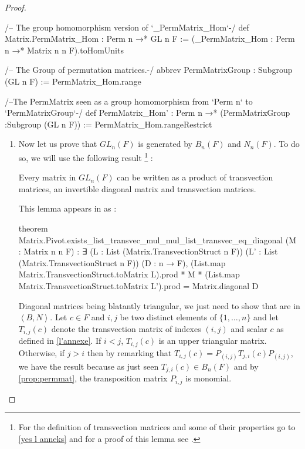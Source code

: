 \begin{proof}
\begin{leancode}
/-- The group homomorphism version of `_PermMatrix_Hom`-/
def Matrix.PermMatrix_Hom : Perm n →* GL n F :=
  (_PermMatrix_Hom : Perm n →* Matrix n n F).toHomUnits

/-- The Group of permutation matrices.-/
abbrev PermMatrixGroup : Subgroup (GL n F) := PermMatrix_Hom.range

/--The PermMatrix seen as a group homomorphism from `Perm n` to `PermMatrixGroup`-/
def PermMatrix_Hom' : Perm n →* (PermMatrixGroup :Subgroup (GL n F)) :=
  PermMatrix_Hom.rangeRestrict

\end{leancode}



\begin{enumerate}
    \item \label{GL1} Now let us prove that $GL_n\left( F \right)$ is generated by $B_{n}\left( F \right)$ and $N_n\left( F \right)$. To do so, we will use the following result \footnote{For the definition of transvection matrices and some of their properties go to \ref{yes l anneks} and for a proof of this lemma see \cite{oui oui la re}.} : 

\begin{lemme} \label{lem:trans}
    Every matrix in $GL_n\left( F \right)$ can be written as a product of transvection matrices, an invertible diagonal matrix and transvection matrices.
\end{lemme}
This lemma appears in \Lean as :
\begin{leancode}
theorem Matrix.Pivot.exists_list_transvec_mul_mul_list_transvec_eq_diagonal 
  (M : Matrix n n F) : ∃ (L : List (Matrix.TransvectionStruct n F)) 
    (L' : List (Matrix.TransvectionStruct n F)) (D : n → F), 
      (List.map Matrix.TransvectionStruct.toMatrix L).prod * M * 
         (List.map Matrix.TransvectionStruct.toMatrix L').prod = Matrix.diagonal D
\end{leancode}

Diagonal matrices being blatantly triangular, we just need to show that  are in $\left<B,N \right>$. Let $c \in F$ and $i,j$ be two distinct elements of $\{ 1,\ldots,n\}$ and let $T_{i,j}\left( c \right)$ denote the transvection matrix of indexes $\left( i,j \right)$ and scalar $c$ as defined in \ref{l'annexe}. If $i<j$, $T_{i,j}\left( c \right)$ is an upper triangular matrix. Otherwise, if $j>i$ then by remarking that $T_{i,j}(c) = P_{\left( i,j \right)} T_{j,i}\left( c \right) P_{\left( i,j \right)}$, we have the result because as just seen $T_{j,i}\left( c \right) \in B_n\left( F \right)$ and by \ref{prop:permmat}, the transposition matrix $P_{i,j}$ is monomial.


\end{enumerate}
\end{proof}
